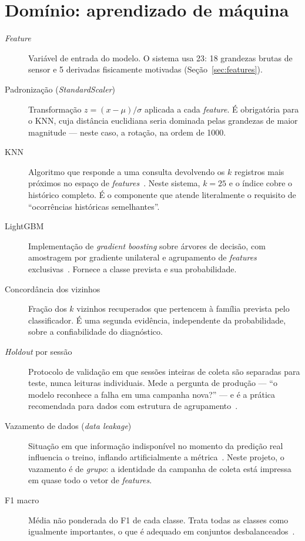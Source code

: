 \section{Domínio: aprendizado de máquina}

\begin{description}
  \item[\textit{Feature}] Variável de entrada do modelo. O sistema usa 23:
    18 grandezas brutas de sensor e 5 derivadas fisicamente motivadas
    (Seção~\ref{sec:features}).

  \item[Padronização (\textit{StandardScaler})] Transformação
    $z = (x - \mu)/\sigma$ aplicada a cada \textit{feature}. É obrigatória para
    o KNN, cuja distância euclidiana seria dominada pelas grandezas de maior
    magnitude --- neste caso, a rotação, na ordem de \num{1000}.

  \item[KNN] Algoritmo que responde a uma consulta devolvendo os $k$ registros
    mais próximos no espaço de \textit{features}~\cite{cover1967nearest}. Neste
    sistema, $k = 25$ e o índice cobre o histórico completo. É o componente que
    atende literalmente o requisito de \enquote{ocorrências históricas
    semelhantes}.

  \item[LightGBM] Implementação de \textit{gradient boosting} sobre árvores de
    decisão, com amostragem por gradiente unilateral e agrupamento de
    \textit{features} exclusivas~\cite{ke2017lightgbm}. Fornece a classe prevista
    e sua probabilidade.

  \item[Concordância dos vizinhos] Fração dos $k$ vizinhos recuperados que
    pertencem à família prevista pelo classificador. É uma segunda evidência,
    independente da probabilidade, sobre a confiabilidade do diagnóstico.

  \item[\textit{Holdout} por sessão] Protocolo de validação em que sessões
    inteiras de coleta são separadas para teste, nunca leituras individuais.
    Mede a pergunta de produção --- \enquote{o modelo reconhece a falha em uma
    campanha nova?} --- e é a prática recomendada para dados com estrutura de
    agrupamento~\cite{roberts2017crossvalidation}.

  \item[Vazamento de dados (\textit{data leakage})] Situação em que informação
    indisponível no momento da predição real influencia o treino, inflando
    artificialmente a métrica~\cite{kaufman2012leakage, kapoor2023leakage}.
    Neste projeto, o vazamento é de \emph{grupo}: a identidade da campanha de
    coleta está impressa em quase todo o vetor de \textit{features}.

  \item[F1 macro] Média não ponderada do F1 de cada classe. Trata todas as
    classes como igualmente importantes, o que é adequado em conjuntos
    desbalanceados~\cite{sokolova2009systematic}.
\end{description}

